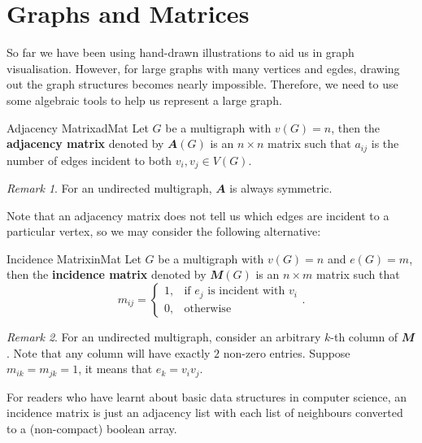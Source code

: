 \documentclass[math]{amznotes}
\theoremstyle{remark}
\newtheorem*{remark}{Remark}
\begin{document}
\section{Graphs and Matrices}
So far we have been using hand-drawn illustrations to aid us in graph visualisation. However, for large graphs with many vertices and egdes, drawing out the graph structures becomes nearly impossible. Therefore, we need to use some algebraic tools to help us represent a large graph.
\begin{dfnbox}{Adjacency Matrix}{adMat}
    Let $G$ be a multigraph with $v(G) = n$, then the {\color{red} \textbf{adjacency matrix}} denoted by $\mathbfit{A}(G)$ is an $n \times n$ matrix such that $a_{ij}$ is the number of edges incident to both $v_i, v_j \in V(G)$.
\end{dfnbox}
\begin{notebox}
    \begin{remark}
        For an undirected multigraph, $\mathbfit{A}$ is always symmetric.
    \end{remark}
\end{notebox}
Note that an adjacency matrix does not tell us which edges are incident to a particular vertex, so we may consider the following alternative:
\begin{dfnbox}{Incidence Matrix}{inMat}
    Let $G$ be a multigraph with $v(G) = n$ and $e(G) = m$, then the {\color{red} \textbf{incidence matrix}} denoted by $\mathbfit{M}(G)$ is an $n \times m$ matrix such that
    \begin{equation*}
        m_{ij} = \begin{cases}
            1, &\textrm{if } e_j \textrm{ is incident with } v_i \\
            0, &\textrm{otherwise}
        \end{cases}.
    \end{equation*}
\end{dfnbox}
\begin{notebox}
    \begin{remark}
        For an undirected multigraph, consider an arbitrary $k$-th column of $\mathbfit{M}$. Note that any column will have exactly $2$ non-zero entries. Suppose $m_{ik} = m_{jk} = 1$, it means that $e_k = v_iv_j$.
    \end{remark}
\end{notebox}
For readers who have learnt about basic data structures in computer science, an incidence matrix is just an adjacency list with each list of neighbours converted to a (non-compact) boolean array.
\end{document}
